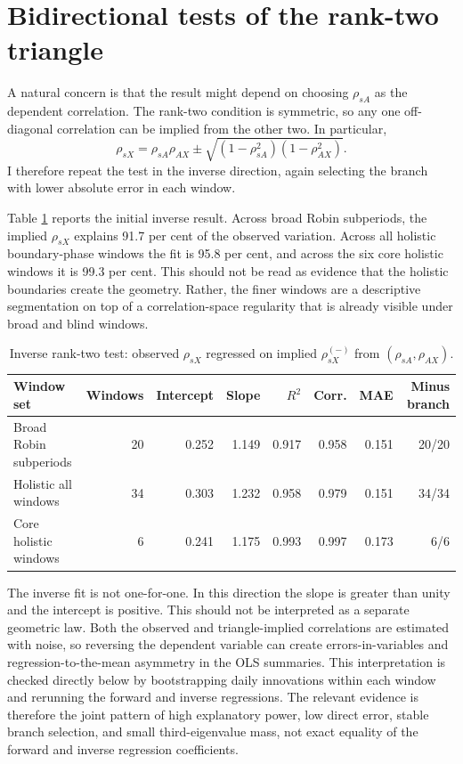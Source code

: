 \documentclass[11pt]{article}
\begin{document}
\section{Bidirectional tests of the rank-two triangle}

A natural concern is that the result might depend on choosing $\rho_{sA}$ as the dependent correlation. The rank-two condition is symmetric, so any one off-diagonal correlation can be implied from the other two. In particular,
\begin{equation}
 \rho_{sX}
 =
 \rho_{sA}\rho_{AX}
 \pm
 \sqrt{(1-\rho_{sA}^2)(1-\rho_{AX}^2)}.
\label{eq:triangle_sX}
\end{equation}
I therefore repeat the test in the inverse direction, again selecting the branch with lower absolute error in each window.

Table \ref{tab:rank2_sX} reports the initial inverse result. Across broad Robin subperiods, the implied $\rho_{sX}$ explains 91.7 per cent of the observed variation. Across all holistic boundary-phase windows the fit is 95.8 per cent, and across the six core holistic windows it is 99.3 per cent. This should not be read as evidence that the holistic boundaries create the geometry. Rather, the finer windows are a descriptive segmentation on top of a correlation-space regularity that is already visible under broad and blind windows.

\begin{table}[!htbp]
\centering
\small
\begin{tabular}{lrrrrrrr}
\toprule
Window set & Windows & Intercept & Slope & $R^2$ & Corr. & MAE & Minus branch \\
\midrule
Broad Robin subperiods & 20 & 0.252 & 1.149 & 0.917 & 0.958 & 0.151 & 20/20 \\
Holistic all windows & 34 & 0.303 & 1.232 & 0.958 & 0.979 & 0.151 & 34/34 \\
Core holistic windows & 6 & 0.241 & 1.175 & 0.993 & 0.997 & 0.173 & 6/6 \\
\bottomrule
\end{tabular}
\caption{Inverse rank-two test: observed $\rho_{sX}$ regressed on implied $\rho_{sX}^{(-)}$ from $(\rho_{sA},\rho_{AX})$.}
\label{tab:rank2_sX}
\end{table}

The inverse fit is not one-for-one. In this direction the slope is greater than unity and the intercept is positive. This should not be interpreted as a separate geometric law. Both the observed and triangle-implied correlations are estimated with noise, so reversing the dependent variable can create errors-in-variables and regression-to-the-mean asymmetry in the OLS summaries. This interpretation is checked directly below by bootstrapping daily innovations within each window and rerunning the forward and inverse regressions. The relevant evidence is therefore the joint pattern of high explanatory power, low direct error, stable branch selection, and small third-eigenvalue mass, not exact equality of the forward and inverse regression coefficients.
\end{document}
